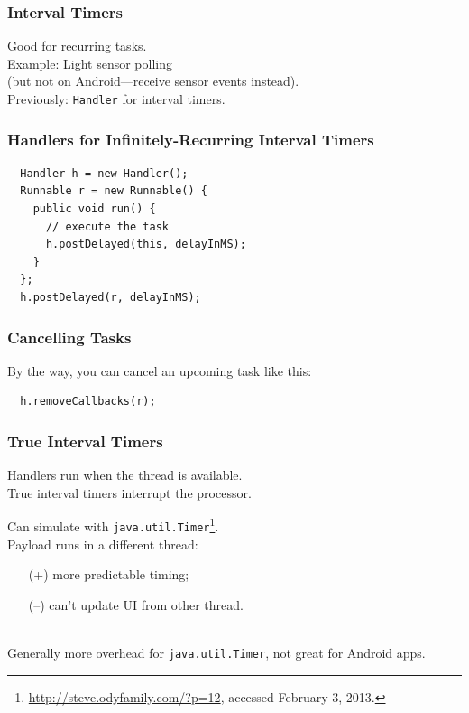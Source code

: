 \begin{frame}
\frametitle{Interval Timers}

\begin{changemargin}{1cm}
\large

Good for recurring tasks.\\[1em]

Example: Light sensor polling\\
 (but not on Android---receive sensor events instead).\\[1em]

Previously: {\tt Handler} for interval timers.

\end{changemargin}

\end{frame}

\begin{frame}[fragile]
\frametitle{Handlers for Infinitely-Recurring Interval Timers}

\begin{verbatim}
  Handler h = new Handler();
  Runnable r = new Runnable() {
    public void run() {
      // execute the task
      h.postDelayed(this, delayInMS);
    }
  };
  h.postDelayed(r, delayInMS);
\end{verbatim}

\end{frame}

\begin{frame}[fragile]
\frametitle{Cancelling Tasks}

\begin{changemargin}{1cm}
By the way, you can cancel an upcoming task like this:
\begin{verbatim}
  h.removeCallbacks(r);
\end{verbatim}
\end{changemargin}
\end{frame}

\begin{frame}
\frametitle{True Interval Timers}

\large
\begin{changemargin}{1cm}
Handlers run when the thread is available.\\[1em]

True interval timers interrupt the processor.

Can simulate with {\tt java.util.Timer}\footnote{\url{http://steve.odyfamily.com/?p=12}, accessed
  February 3, 2013.}. \\[1em]

Payload runs in a different thread:
\begin{itemize}
\item[(+)] more predictable timing;
\item[(--)] can't update UI from other thread.
\end{itemize}
~\\
Generally more overhead for {\tt java.util.Timer}, not great for Android apps.
\end{changemargin}
\end{frame}

